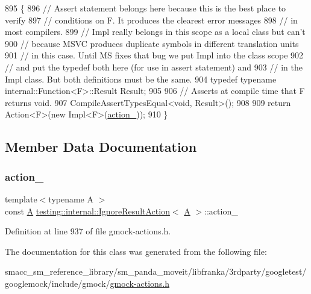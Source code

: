 \begin{DoxyCode}
895                              \{
896     \textcolor{comment}{// Assert statement belongs here because this is the best place to verify}
897     \textcolor{comment}{// conditions on F. It produces the clearest error messages}
898     \textcolor{comment}{// in most compilers.}
899     \textcolor{comment}{// Impl really belongs in this scope as a local class but can't}
900     \textcolor{comment}{// because MSVC produces duplicate symbols in different translation units}
901     \textcolor{comment}{// in this case. Until MS fixes that bug we put Impl into the class scope}
902     \textcolor{comment}{// and put the typedef both here (for use in assert statement) and}
903     \textcolor{comment}{// in the Impl class. But both definitions must be the same.}
904     \textcolor{keyword}{typedef} \textcolor{keyword}{typename} internal::Function<F>::Result Result;
905 
906     \textcolor{comment}{// Asserts at compile time that F returns void.}
907     CompileAssertTypesEqual<void, Result>();
908 
909     \textcolor{keywordflow}{return} Action<F>(\textcolor{keyword}{new} Impl<F>(\hyperlink{classtesting_1_1internal_1_1IgnoreResultAction_a3a1ad6d29d904acb4ca41eeee45de4a0}{action\_}));
910   \}
\end{DoxyCode}


\subsection{Member Data Documentation}
\mbox{\label{classtesting_1_1internal_1_1IgnoreResultAction_a3a1ad6d29d904acb4ca41eeee45de4a0}} 
\subsubsection{\texorpdfstring{action\+\_\+}{action\_}}
{\footnotesize\ttfamily template$<$typename A $>$ \\
const \hyperlink{namespacetesting_a5e9134d655d2fc9323902348083282e7}{A} \hyperlink{classtesting_1_1internal_1_1IgnoreResultAction}{testing\+::internal\+::\+Ignore\+Result\+Action}$<$ \hyperlink{namespacetesting_a5e9134d655d2fc9323902348083282e7}{A} $>$\+::action\+\_\+\hspace{0.3cm}{\ttfamily [private]}}



Definition at line 937 of file gmock-\/actions.\+h.



The documentation for this class was generated from the following file\+:\begin{DoxyCompactItemize}
\item 
smacc\+\_\+sm\+\_\+reference\+\_\+library/sm\+\_\+panda\+\_\+moveit/libfranka/3rdparty/googletest/googlemock/include/gmock/\hyperlink{gmock-actions_8h}{gmock-\/actions.\+h}\end{DoxyCompactItemize}

